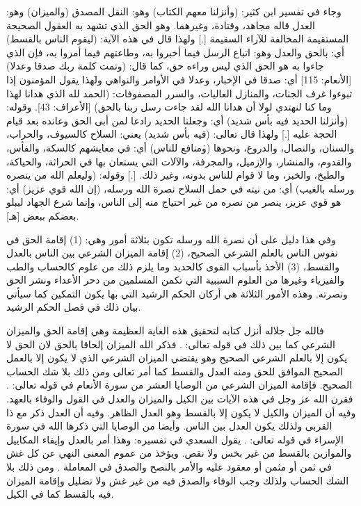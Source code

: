 وجاء في تفسير ابن كثير: (وأنزلنا معهم الكتاب) وهو: النقل المصدق (والميزان) وهو: العدل قاله مجاهد، وقتادة، وغيرهما. وهو الحق الذي تشهد به العقول الصحيحة المستقيمة المخالفة للآراء السقيمة [.] ولهذا قال في هذه الآية: (ليقوم الناس بالقسط) أي: بالحق والعدل وهو: اتباع الرسل فيما أخبروا به، وطاعتهم فيما أمروا به، فإن الذي جاءوا به هو الحق الذي ليس وراءه حق، كما قال: (وتمت كلمة ربك صدقا وعدلا) [الأنعام: 115] أي: صدقا في الإخبار، وعدلا في الأوامر والنواهي \.ولهذا يقول المؤمنون إذا تبوءوا غرف الجنات، والمنازل العاليات، والسرر المصفوفات: (الحمد لله الذي هدانا لهذا وما كنا لنهتدي لولا أن هدانا الله لقد جاءت رسل ربنا بالحق) [الأعراف: 43]. وقوله: (وأنزلنا الحديد فيه بأس شديد) أي: وجعلنا الحديد رادعا لمن أبى الحق وعانده بعد قيام الحجة عليه [.] ولهذا قال تعالى: (فيه بأس شديد) يعني: السلاح كالسيوف، والحراب، والسنان، والنصال، والدروع، ونحوها \.(ومنافع للناس) أي: في معايشهم كالسكة، والفأس، والقدوم، والمنشار، والإزميل، والمجرفة، والآلات التي يستعان بها في الحراثة، والحياكة، والطبخ، والخبز، وما لا قوام للناس بدونه، وغير ذلك. [.] وقوله: (وليعلم الله من ينصره ورسله بالغيب) أي: من نيته في حمل السلاح نصرة الله ورسله، (إن الله قوي عزيز) أي: هو قوي عزيز، ينصر من نصره من غير احتياج منه إلى الناس، وإنما شرع الجهاد ليبلو بعضكم ببعض [هـ].

 وفي هذا دليل على أن نصرة الله ورسله تكون بثلاثة أمور وهي: (1) إقامة الحق في نفوس الناس بالعلم الشرعي الصحيح، (2) إقامة الميزان الشرعي بين الناس بالعدل والقسط، (3) الأخذ بأسباب القوى كالحديد وما يلزم ذلك من علوم كالحساب والطب والفيزياء وغيرها من العلوم السببية التي تكمن المسلمين من دحر الأعداء ونشر الحق ونصرته. وهذه الأمور الثلاثة هي أركان الحكم الرشيد التي بها يكون التمكين كما سيأتي بيان ذلك في فصل الحكم الرشيد.

فالله جل جلاله أنزل كتابه لتحقيق هذه الغاية العظيمة وهي إقامة الحق والميزان الشرعي كما بين ذلك في قوله تعالى:
\quranayah*[42][17]{\footnotesize \surahname*[42]}.
فذكر الله الميزان إلحاقا بالحق لان الحق لا يكون إلا بالعلم الشرعي الصحيح وهو يقتضي الميزان الشرعي الذي لا يكون إلا بالعمل الصحيح الموافق للحق ومنه العدل والقسط كما أمر تعالى ومن ذلك بلا شك الحساب الصحيح. فإقامة الميزان الشرعي من الوصايا العشر من سورة الأنعام في قوله تعالى:
\quranayah*[6][152][12]{\footnotesize \surahname*[6]}. فقرن الله عز وجل في هذه الآيات بين الكيل والميزان والعدل في القول والوفاء بالعهد. وفيه أن الميزان والكيل لا يكون إلا بالقسط وهو العدل الظاهر. وفيه أن العدل ذكر مع ذا القربى ولذلك يكون العدل بين الناس.
وأيضا من الوصايا التي ذكرها الله في سورة الإسراء في قوله تعالى:
\quranayah*[17][35]{\footnotesize \surahname*[17]}. يقول السعدي في تفسيره:
وهذا أمر بالعدل وإيفاء المكاييل والموازين بالقسط من غير بخس ولا نقص. ويؤخذ من عموم المعنى النهي عن كل غش في ثمن أو مثمن أو معقود عليه والأمر بالنصح والصدق في المعاملة \cite{tafsir_Saadi}. ومن ذلك بلا الشك الحساب ولذلك وجب الوفاء والصدق فيه من غير غش ولا تضليل وإقامة الميزان فيه بالقسط كما في الكيل.

